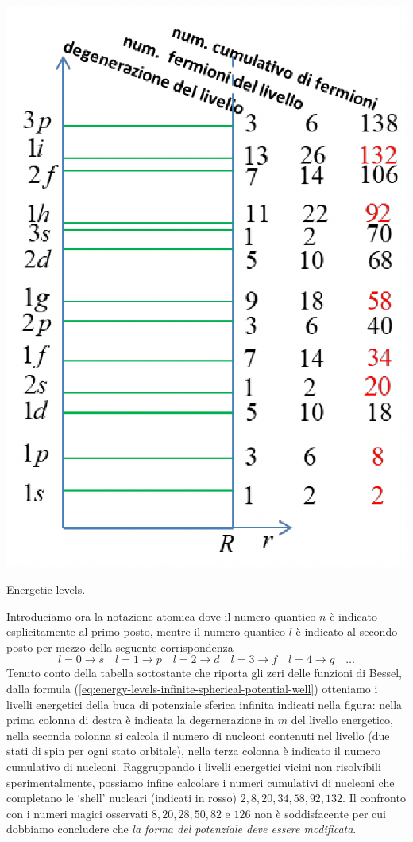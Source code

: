 \begin{marginfigure}
	\includegraphics{figs/energetic-levels-infinite-potential-well}
	\caption{Energetic levels.}
	\label{fig:energetic-levels-infinite-potential-well}
\end{marginfigure}
Introduciamo ora la notazione atomica dove il numero quantico $n$ è indicato esplicitamente al primo posto, mentre il numero quantico $l$ è indicato al secondo posto per mezzo della seguente corrispondenza
\[
l = 0 \to s \quad l = 1 \to p \quad l = 2 \to d \quad l = 3 \to f
\quad l = 4 \to g \quad \dots
\]
Tenuto conto della tabella sottostante che riporta gli zeri delle funzioni di Bessel, dalla formula (\ref{eq:energy-levels-infinite-spherical-potential-well}) otteniamo i livelli energetici della buca di potenziale sferica infinita indicati nella figura: nella prima colonna di destra è indicata la degernerazione in $m$ del livello energetico, nella seconda colonna si calcola il numero di nucleoni contenuti nel livello (due stati di spin per ogni stato orbitale), nella terza colonna è indicato il numero cumulativo di nucleoni. Raggruppando i livelli energetici vicini non risolvibili sperimentalmente, possiamo infine calcolare i numeri cumulativi di nucleoni che completano le ‘shell’ nucleari (indicati in rosso) $2, 8, 20, 34, 58, 92, 132$. Il confronto con i numeri magici osservati $8, 20, 28, 50, 82$ e $126$ non è soddisfacente per cui dobbiamo concludere che \emph{la forma del potenziale deve essere modificata}.
